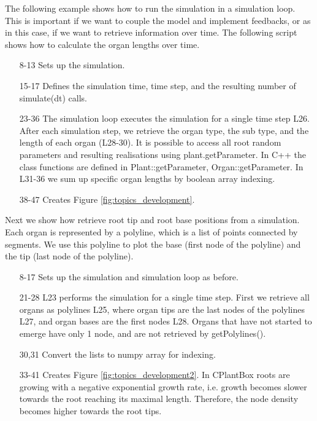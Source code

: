 The following example shows how to run the simulation in a simulation loop. This is important if we want to couple the model and implement feedbacks, or as in this case, if we want to retrieve information over time. The following script shows how to calculate the organ lengths over time. 



\begin{itemize}
\item[8-13] Sets up the simulation.
\item[15-17] Defines the simulation time, time step, and the resulting number of simulate(dt) calls. 
\item[23-36] The simulation loop executes the simulation for a single time step L26. After each simulation step, we retrieve the organ type, the sub type, and the length of each organ (L28-30). It is possible to access all root random parameters and resulting realisations using plant.getParameter. In C++ the class functions are defined in Plant::getParameter, Organ::getParameter. In L31-36 we sum up specific organ lengths by boolean array indexing.
\item[38-47] Creates Figure \ref{fig:topics_development}.
\end{itemize}

Next we show how retrieve root tip and root base positions from a simulation. Each organ is represented by a polyline, which is a list of points connected by segments. We use this polyline to plot the base (first node of the polyline) and the tip (last node of the polyline). 



\begin{itemize}

\item[8-17] Sets up the simulation and simulation loop as before.
\item[21-28] L23 performs the simulation for a single time step. First we retrieve all organs as polylines L25, where organ tips are the last nodes of the polylines L27, and organ bases are the first nodes L28. Organs that have not started to emerge have only 1 node, and are not retrieved by getPolylines().
\item[30,31] Convert the lists to numpy array for indexing.
\item[33-41] Creates Figure \ref{fig:topics_development2}. In CPlantBox roots are growing with a negative exponential growth rate, i.e. growth becomes slower towards the root reaching its maximal length. Therefore, the node density becomes higher towards the root tips. 
\end{itemize}

